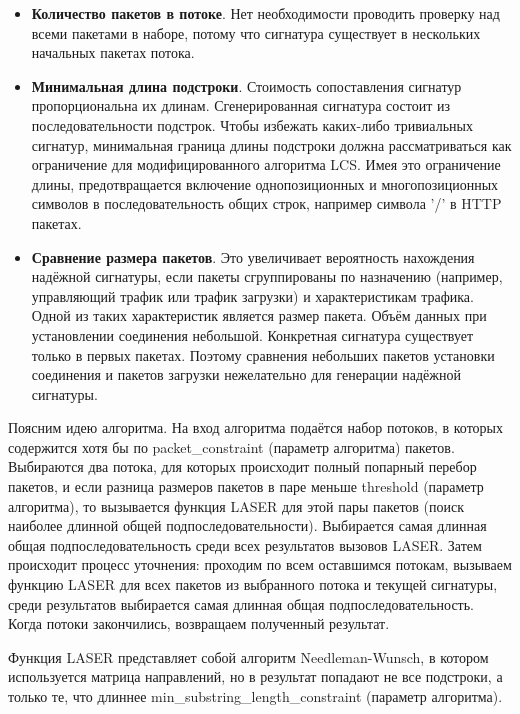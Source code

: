 \begin{itemize}
    \item \textbf{Количество пакетов в потоке}.
    Нет необходимости проводить проверку над всеми пакетами в наборе,
    потому что сигнатура существует в нескольких начальных пакетах потока.
    \item \textbf{Минимальная длина подстроки}. Стоимость сопоставления сигнатур пропорциональна их длинам.
    Сгенерированная сигнатура состоит из последовательности подстрок.
    Чтобы избежать каких-либо тривиальных сигнатур,
    минимальная граница длины подстроки должна рассматриваться как ограничение для модифицированного алгоритма LCS.
    Имея это ограничение длины, предотвращается включение однопозиционных и многопозиционных символов в последовательность общих строк,
    например символа '/' в HTTP пакетах.
    \item \textbf{Сравнение размера пакетов}. Это увеличивает вероятность нахождения надёжной сигнатуры,
    если пакеты сгруппированы по назначению (например, управляющий трафик или трафик загрузки) и характеристикам трафика.
    Одной из таких характеристик является размер пакета. Объём данных при установлении соединения небольшой.
    Конкретная сигнатура существует только в первых пакетах.
    Поэтому сравнения небольших пакетов установки соединения и пакетов загрузки нежелательно для генерации надёжной сигнатуры.

\end{itemize}

Поясним идею алгоритма. На вход алгоритма подаётся набор потоков, в которых содержится хотя бы по packet\_constraint
(параметр алгоритма) пакетов. Выбираются два потока, для которых происходит полный попарный перебор пакетов,
и если разница размеров пакетов в паре меньше threshold (параметр алгоритма),
то вызывается функция LASER для этой пары пакетов (поиск наиболее длинной общей подпоследовательности).
Выбирается самая длинная общая подпоследовательность среди всех результатов вызовов LASER.
Затем происходит процесс уточнения: проходим по всем оставшимся потокам, вызываем функцию LASER
для всех пакетов из выбранного потока и текущей сигнатуры,
среди результатов выбирается самая длинная общая подпоследовательность.
Когда потоки закончились, возвращаем полученный результат.

Функция LASER представляет собой алгоритм Needleman-Wunsch, в котором используется матрица направлений,
но в результат попадают не все подстроки, а только те, что длиннее min\_substring\_length\_constraint (параметр алгоритма).

